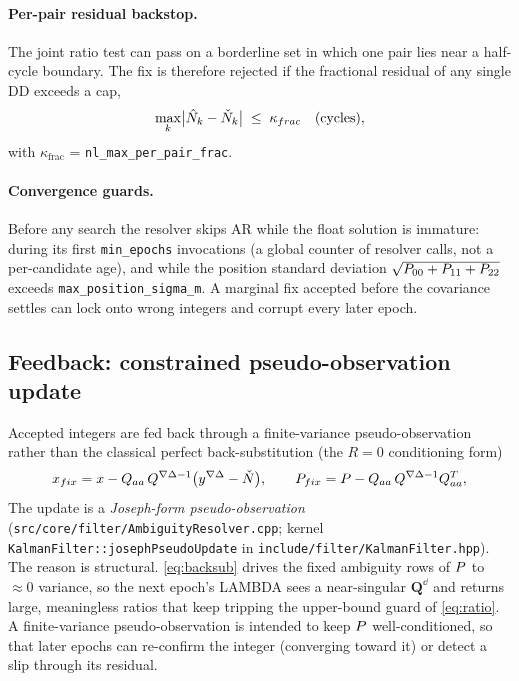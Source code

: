 \documentclass[main.tex]{subfiles}
\begin{document}
\paragraph{Per-pair residual backstop.}
The joint ratio test can pass on a borderline set in which one pair lies
near a half-cycle boundary.  The fix is therefore rejected if the
fractional residual of any single DD exceeds a cap,
\begin{equation}
\max_k \bigl|\hat{N}_k - \check{N}_k\bigr|
  \;\le\; \kappa_{frac}
\quad\text{(cycles)},
\label{eq:perpair}
\end{equation}
with $\kappa_{\mathrm{frac}}$ = \texttt{nl\_max\_per\_pair\_frac}.

\paragraph{Convergence guards.}
Before any search the resolver skips AR while the float solution is
immature: during its first \texttt{min\_epochs} invocations (a global
counter of resolver calls, not a per-candidate age), and while the
position standard deviation $\sqrt{P_{00} + P_{11} +
P_{22}}$ exceeds \texttt{max\_position\_sigma\_m}.  A marginal fix
accepted before the covariance settles can lock onto wrong integers and
corrupt every later epoch.

\subsection{Feedback: constrained pseudo-observation
update}\label{sec:ar-feedback}

Accepted integers are fed back through a finite-variance pseudo-observation
rather than the classical perfect back-substitution (the $R = 0$
conditioning form)
\begin{equation}
x_{fix}
  = x - Q_{aa}\,Q^{\nabla\Delta-1}
    \bigl(y^{\nabla\Delta} - \check{N}\bigr),
\qquad
P_{fix}
  = P - Q_{aa}\,Q^{\nabla\Delta-1}
    Q_{aa}^{T},
\label{eq:backsub}
\end{equation}
The update is a \emph{Joseph-form pseudo-observation}
(\texttt{src/core/filter/AmbiguityResolver.cpp}; kernel
\texttt{KalmanFilter::josephPseudoUpdate} in
\texttt{include/filter/KalmanFilter.hpp}).  The reason is structural.
\eqref{eq:backsub} drives the fixed ambiguity rows of $P$ to
$\approx 0$ variance, so the next epoch's \textsc{LAMBDA} sees a
near-singular $\bm{Q}^{\dd{}}$ and returns large, meaningless ratios
that keep tripping the upper-bound guard of \eqref{eq:ratio}.  A
finite-variance pseudo-observation is intended to keep $P$
well-conditioned, so that later epochs can re-confirm the integer
(converging toward it) or detect a slip through its residual.
\end{document}
